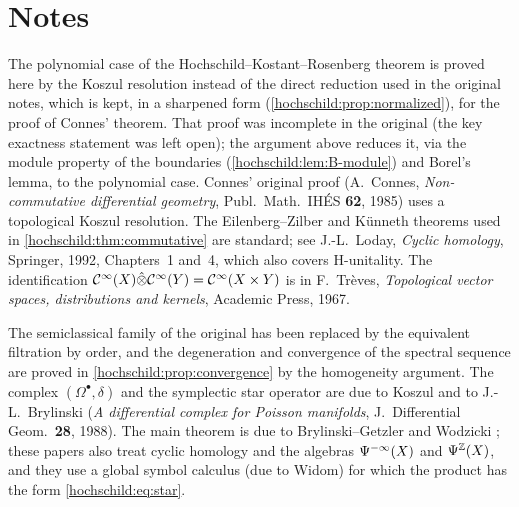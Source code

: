 \section*{Notes}
The polynomial case of the Hochschild--Kostant--Rosenberg theorem is proved
here by the Koszul resolution instead of the direct reduction used in the
original notes, which is kept, in a sharpened form
(\cref{hochschild:prop:normalized}), for the proof of Connes' theorem. That
proof was incomplete in the original (the key exactness statement was left
open); the argument above reduces it, via the module property of the
boundaries (\cref{hochschild:lem:B-module}) and Borel's lemma, to the
polynomial case. Connes' original proof (A.~Connes, \emph{Non-commutative
differential geometry}, Publ.\ Math.\ IH\'ES \textbf{62}, 1985) uses a
topological Koszul resolution. The Eilenberg--Zilber and K\"unneth theorems
used in \cref{hochschild:thm:commutative} are standard; see J.-L.~Loday,
\emph{Cyclic homology}, Springer, 1992, Chapters~1 and~4, which also covers
H-unitality. The identification $\mathcal{C}^\infty(X)\hat\otimes\mathcal{C}^\infty(Y)=\mathcal{C}^\infty(X\times Y)$ is
in F.~Tr\`eves, \emph{Topological vector spaces, distributions and kernels},
Academic Press, 1967.

The semiclassical family of the original has been replaced by the
equivalent filtration by order, and the degeneration and convergence of the
spectral sequence are proved in \cref{hochschild:prop:convergence} by the
homogeneity argument. The complex $(\Omega^\bullet,\delta)$ and the
symplectic star operator are due to Koszul and to J.-L.~Brylinski (\emph{A
differential complex for Poisson manifolds}, J.\ Differential Geom.\
\textbf{28}, 1988). The main theorem is due to Brylinski--Getzler
\cite{Brylinski-Getzler} and Wodzicki \cite{Wodzicki-residue,Wodzicki-cyclic};
these papers also treat cyclic homology and the algebras $\Psi^{-\infty}(X)$
and $\Psi^{\mathbb{Z}}(X)$, and they use a global symbol calculus (due to Widom)
for which the product has the form \eqref{hochschild:eq:star}.
